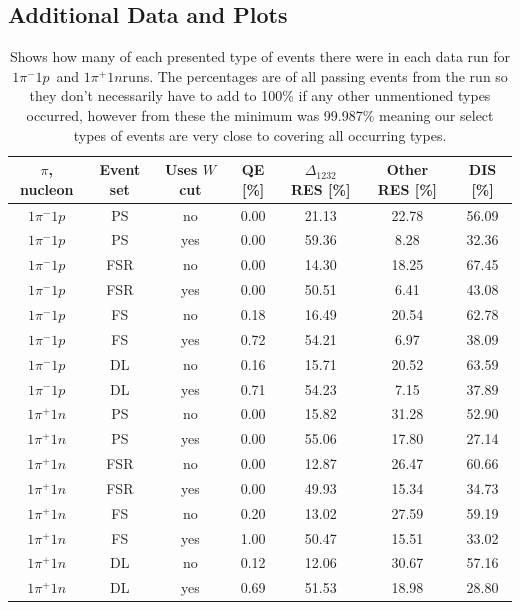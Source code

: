 \documentclass[a4paper,12pt]{article}
\newcommand{\md}{$1\pi^-1p$}
\newcommand{\pd}{$1\pi^+1n$}
\begin{document}
\newpage

\printbibliography

\newpage

\begin{appendices}
    \section{Additional Data and Plots}\label{app:extra}
    \begin{table}[H]
        \begin{center}
            \begin{tabular}{ c | c | c | c | c | c | c }
                $\pi$, nucleon & Event set & Uses $W$ cut & QE [\%] & $\Delta_{1232}$ RES [\%] & Other RES [\%] & DIS [\%] \\
                \hline
                $1\pi^-1p$ & PS & no & 0.00 & 21.13 & 22.78 & 56.09 \\
                $1\pi^-1p$ & PS & yes & 0.00 & 59.36 & 8.28 & 32.36 \\
                $1\pi^-1p$ & FSR & no & 0.00 & 14.30 & 18.25 & 67.45 \\
                $1\pi^-1p$ & FSR & yes & 0.00 & 50.51 & 6.41 & 43.08 \\
                $1\pi^-1p$ & FS & no & 0.18 & 16.49 & 20.54 & 62.78 \\
                $1\pi^-1p$ & FS & yes & 0.72 & 54.21 & 6.97 & 38.09 \\
                $1\pi^-1p$ & DL & no & 0.16 & 15.71 & 20.52 & 63.59 \\
                $1\pi^-1p$ & DL & yes & 0.71 & 54.23 & 7.15 & 37.89 \\
                $1\pi^+1n$ & PS & no & 0.00 & 15.82 & 31.28 & 52.90 \\
                $1\pi^+1n$ & PS & yes & 0.00 & 55.06 & 17.80 & 27.14 \\
                $1\pi^+1n$ & FSR & no & 0.00 & 12.87 & 26.47 & 60.66 \\
                $1\pi^+1n$ & FSR & yes & 0.00 & 49.93 & 15.34 & 34.73 \\
                $1\pi^+1n$ & FS & no & 0.20 & 13.02 & 27.59 & 59.19 \\
                $1\pi^+1n$ & FS & yes & 1.00 & 50.47 & 15.51 & 33.02 \\
                $1\pi^+1n$ & DL & no & 0.12 & 12.06 & 30.67 & 57.16 \\
                $1\pi^+1n$ & DL & yes & 0.69 & 51.53 & 18.98 & 28.80
            \end{tabular}
        \end{center}
        \caption{
            Shows how many of each presented type of events there were in each data run for \md\ and \pd runs.
            The percentages are of all passing events from the run so they don't necessarily have to add to 100\% if any other unmentioned types occurred, however from these the minimum was 99.987\% meaning our select types of events are very close to covering all occurring types.
        }\label{fig:extra1}
    \end{table}


\end{appendices}
\end{document}
